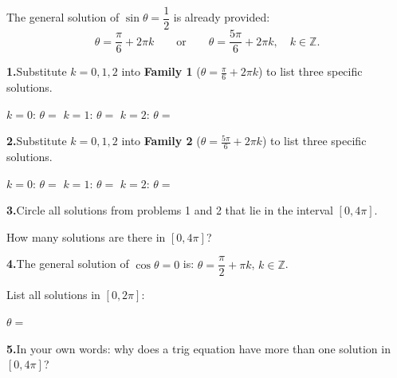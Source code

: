 \documentclass[10pt]{article}
\begin{document}
\begin{tcolorbox}[colback=white, colframe=black!40,
    title=\textbf{Tier R --- Remediate},
    fonttitle=\bfseries, arc=2mm, left=3mm, right=3mm, top=2mm, bottom=2mm]

The general solution of $\sin\theta = \dfrac{1}{2}$ is already provided:
\[
  \theta = \frac{\pi}{6} + 2\pi k \qquad \text{or} \qquad \theta = \frac{5\pi}{6} + 2\pi k,
  \quad k \in \mathbb{Z}.
\]

\textbf{1.}\quad Substitute $k = 0, 1, 2$ into \textbf{Family 1}
($\theta = \tfrac{\pi}{6} + 2\pi k$) to list three specific solutions.

\vspace{4pt}
$k=0$: $\theta = $ \underline{\hspace{2cm}} \quad
$k=1$: $\theta = $ \underline{\hspace{2.5cm}} \quad
$k=2$: $\theta = $ \underline{\hspace{2.5cm}}

\vspace{0.10in}
\textbf{2.}\quad Substitute $k = 0, 1, 2$ into \textbf{Family 2}
($\theta = \tfrac{5\pi}{6} + 2\pi k$) to list three specific solutions.

\vspace{4pt}
$k=0$: $\theta = $ \underline{\hspace{2cm}} \quad
$k=1$: $\theta = $ \underline{\hspace{2.5cm}} \quad
$k=2$: $\theta = $ \underline{\hspace{2.5cm}}

\vspace{0.10in}
\textbf{3.}\quad Circle all solutions from problems 1 and 2 that lie in
the interval $[0, 4\pi]$.

How many solutions are there in $[0, 4\pi]$? \underline{\hspace{1.5cm}}

\vspace{0.10in}
\textbf{4.}\quad The general solution of $\cos\theta = 0$ is:
$\theta = \dfrac{\pi}{2} + \pi k$, $k \in \mathbb{Z}$.

List all solutions in $[0, 2\pi]$:

$\theta = $ \underline{\hspace{6cm}}

\vspace{0.10in}
\textbf{5.}\quad In your own words: why does a trig equation have more than
one solution in $[0, 4\pi]$?


\end{tcolorbox}
\end{document}
